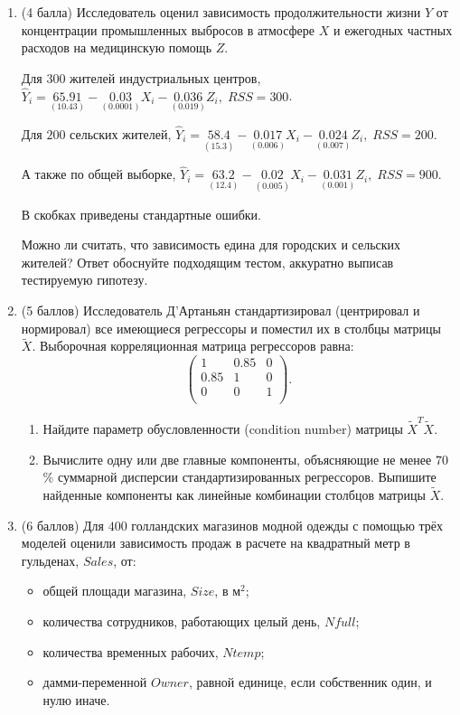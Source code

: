 \begin{enumerate}
\item
(4 балла)
Исследователь оценил зависимость продолжительности жизни $Y$ от концентрации
промышленных выбросов в атмосфере $X$ и ежегодных частных расходов на медицинскую
помощь $Z$.

Для $300$ жителей индустриальных центров, $\hat{Y}_i = \underset{(10.43)}{65.91} -
\underset{(0.0001)}{0.03}X_i - \underset{(0.019)}{0.036}Z_i, \; RSS = 300$.

Для $200$ сельских жителей, $\hat{Y}_i = \underset{(15.3)}{58.4} -
\underset{(0.006)}{0.017}X_i - \underset{(0.007)}{0.024}Z_i, \; RSS = 200$.

А также по общей выборке, $\hat{Y}_i = \underset{(12.4)}{63.2} -
\underset{(0.005)}{0.02}X_i - \underset{(0.001)}{0.031}Z_i, \; RSS = 900$.

В скобках приведены стандартные ошибки.

Можно ли считать, что зависимость едина для городских и сельских жителей?
Ответ обоснуйте подходящим тестом, аккуратно выписав тестируемую гипотезу.

\item
(5 баллов)
Исследователь Д'Артаньян стандартизировал (центрировал и нормировал) все
имеющиеся регрессоры и поместил их в столбцы матрицы $\tilde X$. Выборочная
корреляционная матрица регрессоров равна:
\[
\begin{pmatrix}
1 & 0.85 & 0  \\
0.85 & 1 & 0  \\
0 & 0 & 1 \\
\end{pmatrix}.
\]
\begin{enumerate}
    \item Найдите параметр обусловленности (condition number) матрицы
    $\tilde X^T \tilde X$.
    \item Вычислите одну или две главные компоненты, объясняющие не менее
    $70$\% суммарной дисперсии стандартизированных регрессоров. Выпишите
    найденные компоненты как линейные комбинации столбцов матрицы $\tilde X$.
\end{enumerate}

\item
(6 баллов)
Для $400$ голландских магазинов модной одежды с помощью трёх моделей оценили
зависимость продаж в расчете на квадратный метр в гульденах, $Sales$, от:
\begin{itemize}
\item общей площади магазина, $Size$, в м$^2$;
\item количества сотрудников, работающих целый день, $Nfull$;
\item количества временных рабочих, $Ntemp$;
\item дамми-переменной $Owner$, равной единице, если собственник один, и нулю иначе.
\end{itemize}


\end{enumerate}
